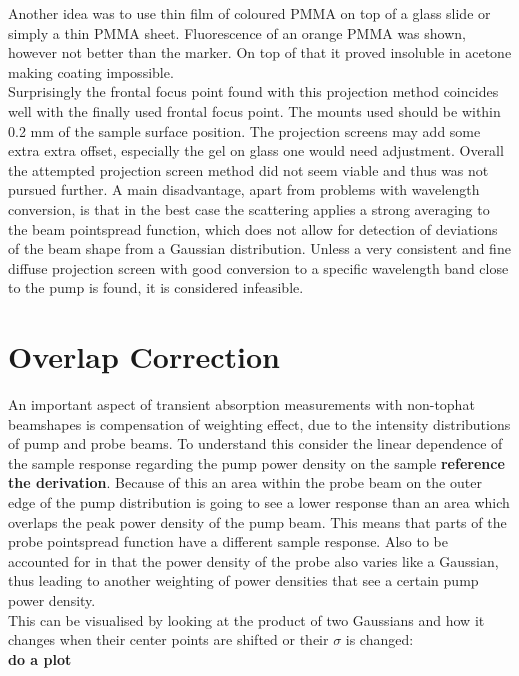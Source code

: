 \documentclass[twoside,openright]{scrreprt}
\begin{document}
Another idea was to use thin film of coloured PMMA on top of a glass slide or simply a thin PMMA sheet. Fluorescence of an orange PMMA was shown, however not better than the marker. On top of that it proved insoluble in acetone making coating impossible.\\

Surprisingly the frontal focus point found with this projection method coincides well with the finally used frontal focus point. The mounts used should be within 0.2 mm of the sample surface position. The projection screens may add some extra extra offset, especially the gel on glass one would need adjustment.
Overall the attempted projection screen method did not seem viable and thus was not pursued further. A main disadvantage, apart from problems with wavelength conversion, is that in the best case the scattering applies a strong averaging to the beam pointspread function, which does not allow for detection of deviations of the beam shape from a Gaussian distribution. Unless a very consistent and fine diffuse projection screen with good conversion to a specific wavelength band close to the pump is found, it is considered infeasible.





\chapter{Overlap Correction}\label{chp:OverlapCorrection}
An important aspect of transient absorption measurements with non-tophat beamshapes is compensation of weighting effect, due to the intensity distributions of pump and probe beams. To understand this consider the linear dependence of the sample response regarding the pump power density on the sample \textbf{reference the derivation}. Because of this an area within the probe beam on the outer edge of the pump distribution is going to see a lower response than an area which overlaps the peak power density of the pump beam. This means that parts of the probe pointspread function have a different sample response. Also to be accounted for in that the power density of the probe also varies like a Gaussian, thus leading to another weighting of power densities that see a certain pump power density.\\
This can be visualised by looking at the product of two Gaussians and how it changes when their center points are shifted or their $\sigma$ is changed:\\ \textbf{do a plot}
\end{document}
